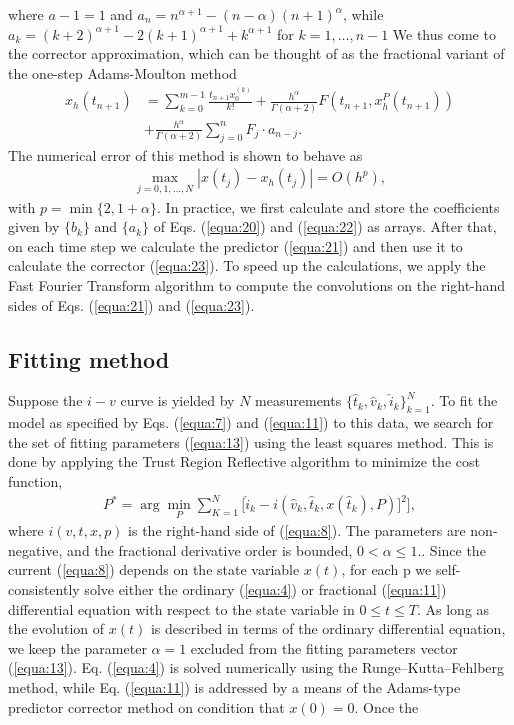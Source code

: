 \documentclass[10pt]{article}
\begin{document}
\begin{multicols}{2}
        where $a-1 = 1$ and $a_n = n^{\alpha + 1}-(n-\alpha)(n+1)^\alpha$, while $a_k = (k+2)^{\alpha + 1} - 2(k+1)^{\alpha + 1} + k^{\alpha + 1}$ for $k = 1, \dots, n-1$ We thus come to the corrector approximation, which can be thought of as the fractional variant of the one-step Adams-Moulton method
        \begin{align}
            x_h(t_{n+1}) & = \sum_{k=0}^{m-1} \frac{t_{n+1}x_0^{(k)}}{k!} + \frac{h^\alpha}{\Gamma (\alpha + 2)}  F(t_{n+1}, x_h^P (t_{n+1})) \nonumber \\ &+ \frac{h^\alpha}{\Gamma (\alpha + 2)} \sum_{j=0}^n F_j \cdot a_{n-j}. \label{equa:23}
        \end{align}
        The numerical error of this method is shown to behave as
        \begin{align}
            \max_{j=0,1,\dots,N} |x(t_j)-x_h(t_j)|=O(h^p), \label{equa:24}
        \end{align}
        with $p=\min\{2,1+\alpha\}$. In practice, we first calculate and store the coefficients given by $\{b_k\}$ and $\{a_k\}$ of Eqs. (\ref{equa:20}) and (\ref{equa:22}) as arrays. After that, on each time step we calculate the predictor (\ref{equa:21}) and then use it to calculate the corrector (\ref{equa:23}). To speed up the calculations, we apply the Fast Fourier Transform algorithm to compute the convolutions on the right-hand sides of Eqs. (\ref{equa:21}) and (\ref{equa:23}).
        \par
        {\centering \subsection{ \bfseries Fitting method}}
        Suppose the $i-v$ curve is yielded by $N$ measurements $\{\hat{t}_k, \hat{v}_k, \hat{i}_k\}_{k=1}^N$. To fit the model as specified by Eqs. (\ref{equa:7}) and (\ref{equa:11}) to this data, we search for the set of fitting parameters (\ref{equa:13}) using the least squares method. This is done by applying the Trust Region Reflective algorithm to minimize the cost function,
        \begin{align}
            P^* = \arg \min_P \sum_{K=1}^N \biggl[\hat{i}_k-i(\hat{v}_k,\hat{t}_k, x(\hat{t}_k),P)]^2 \biggr], \label{equa:25}
        \end{align}
        where $i(v, t, x, p)$ is the right-hand side of (\ref{equa:8}). The parameters are non-negative, and the fractional derivative order is bounded, $0 < \alpha \le 1.$. Since the current (\ref{equa:8}) depends on the state variable $x(t)$, for each p we self-consistently solve either the ordinary (\ref{equa:4}) or fractional (\ref{equa:11}) differential equation with respect to the state variable in $0 \le t \le T$. As long as the evolution of $x(t)$ is described in terms of the ordinary differential equation, we keep the parameter $\alpha = 1$ excluded from the fitting parameters vector (\ref{equa:13}). Eq. (\ref{equa:4}) is solved numerically using the Runge–Kutta–Fehlberg method, while Eq. (\ref{equa:11}) is addressed by a means of the Adams-type predictor corrector method on condition that $x(0) = 0$. Once the

\end{multicols}
\end{document}
